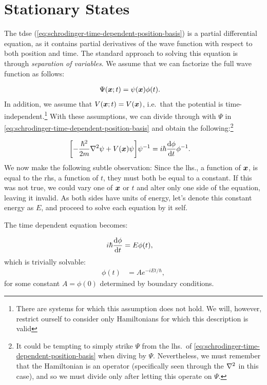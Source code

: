 \documentclass[Thesis.tex]{subfiles}
\begin{document}
\section{Stationary States}

The \gls{tdse} (\cref{eq:schrodinger-time-dependent-position-basis}) is a partial differential equation,
as it contains partial derivatives of the wave function with respect to both position and
time. The standard approach to solving this equation is through \emph{separation of
variables}. We assume that we can factorize the full wave function as follows:

\begin{align}
    \Psi(\bm{x}; t) &= \psi(\bm{x})\phi(t).\label{eq:separatable-wave-func-def}
\end{align}
%
In addition, we assume that $V(\bm{x}; t) = V(\bm{x})$, i.e.\ that the potential is
time-independent.\footnote{There are systems for which this assumption does not hold. We
will, however, restrict ourself to consider only Hamiltonians for which this description
is valid} With these assumptions, we can divide through with $\Psi$ in
\cref{eq:schrodinger-time-dependent-position-basis} and obtain the
following:\footnote{It could be tempting to simply strike $\Psi$ from the lhs.\ of
\cref{eq:schrodinger-time-dependent-position-basis} when diving by $\Psi$. Nevertheless, we
must remember that the Hamiltonian is an operator (specifically seen through the
$\laplacian$ in this case), and so we must divide only after letting this operate on
$\Psi$.}

\begin{align}
    \qty[- \frac{\hbar^2}{2m} \laplacian \psi + V(\vb x)\psi]\psi^{-1} &=
    i\hbar\dv{\phi}{t} \phi^{-1}.
\end{align}
%
We now make the following subtle observation: Since the lhs., a function of $\bm{x}$, is
equal to the rhs, a function of $t$, they must both be equal to a constant. If
this was not true, we could vary one of $\bm{x}$ or $t$ and alter only one side of
the equation, leaving it invalid.
As both sides have units of energy, let's denote this constant energy as $E$, and proceed
to solve each equation by it self.

The time dependent equation becomes:

\begin{align}
    i\hbar \dv{\phi}{t} &= E\phi(t),
\end{align}
which is trivially solvable:
\begin{align}
    \phi(t) &= Ae^{-iEt/\hbar},
\end{align}
for some constant $A=\phi(0)$ determined by boundary conditions.
\end{document}
